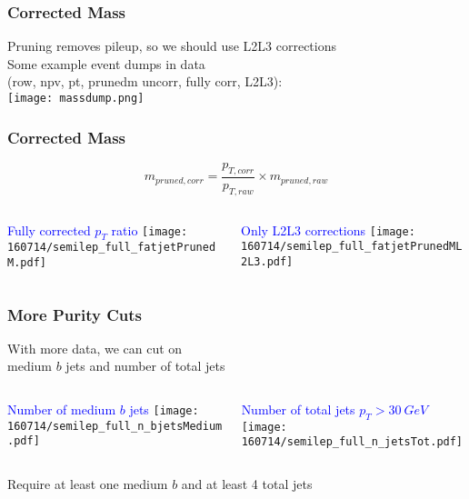 \documentclass{beamer}
\begin{document}
\begin{frame}
  \frametitle{Corrected Mass}
  Pruning removes pileup, so we should use L2L3 corrections \\
  Some example event dumps in data \\ (row, npv, pt, prunedm uncorr, fully corr, L2L3): \\
  \centering
  \texttt{[image: massdump.png]}
\end{frame}

\begin{frame}
  \frametitle{Corrected Mass}
  \[
  m_{pruned,corr} = \frac{p_{T,corr}}{p_{T,raw}} \times m_{pruned,raw}
  \]
  \vspace{12pt}
  \begin{columns}
    \begin{column}{0.5\linewidth}
      \centering
      \textcolor{blue}{Fully corrected $p_T$ ratio}
      \texttt{[image: 160714/semilep\_full\_fatjetPrunedM.pdf]}
    \end{column}
    \begin{column}{0.5\linewidth}
      \centering
      \textcolor{blue}{Only L2L3 corrections}
      \texttt{[image: 160714/semilep\_full\_fatjetPrunedML2L3.pdf]}
    \end{column}
  \end{columns}
\end{frame}

\begin{frame}
  \frametitle{More Purity Cuts}
  With more data, we can cut on \\ medium $b$ jets and number of total jets
  \vspace{6pt}
  \begin{columns}
    \begin{column}{0.5\linewidth}
      \centering
      \textcolor{blue}{Number of medium $b$ jets}
      \texttt{[image: 160714/semilep\_full\_n\_bjetsMedium.pdf]}
    \end{column}
    \begin{column}{0.5\linewidth}
      \centering
      \textcolor{blue}{Number of total jets $p_T > \SI{30}{GeV}$}
      \texttt{[image: 160714/semilep\_full\_n\_jetsTot.pdf]}
    \end{column}
  \end{columns}
  \vspace{6pt}
  Require at least one medium $b$ and at least 4 total jets
\end{frame}
\end{document}
